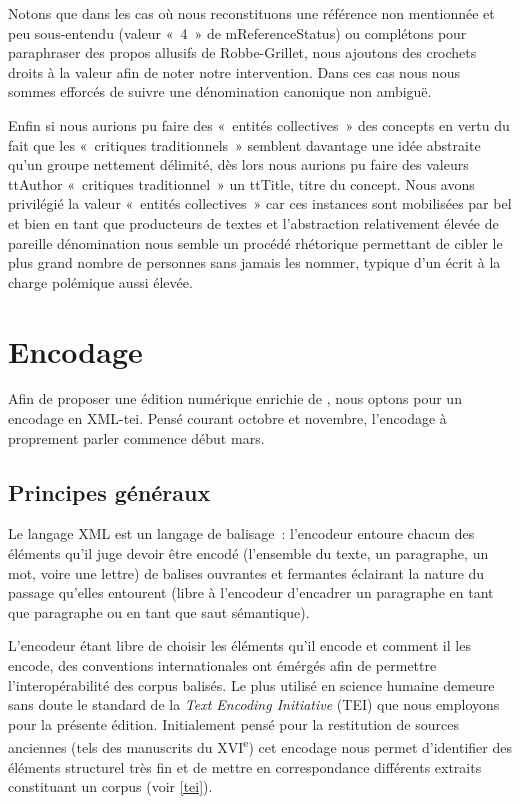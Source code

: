\documentclass[12pt, a4paper]{article}
\begin{document}
Notons que dans les cas où nous reconstituons une référence non mentionnée et peu sous-entendu (valeur «~4~» de mReferenceStatus) ou complétons pour paraphraser des propos allusifs de Robbe-Grillet, nous ajoutons des crochets droits à la valeur afin de noter notre intervention. Dans ces cas nous nous sommes efforcés de suivre une dénomination canonique non ambiguë.

Enfin si nous aurions pu faire des «~entités collectives~» des concepts en vertu du fait que les «~critiques traditionnels~» semblent davantage une idée abstraite qu'un groupe nettement délimité, dès lors nous aurions pu faire des valeurs ttAuthor «~critiques traditionnel~» un ttTitle, titre du concept. Nous avons privilégié la valeur «~entités collectives~» car ces instances sont mobilisées par \robbe{} bel et bien en tant que producteurs de textes et l'abstraction relativement élevée de pareille dénomination nous semble un procédé rhétorique permettant de cibler le plus grand nombre de personnes sans jamais les nommer, typique d'un écrit à la charge polémique aussi élevée.






\section{Encodage}
Afin de proposer une édition numérique enrichie de \punr, nous optons pour un encodage en XML-tei. Pensé courant octobre et novembre, l'encodage à proprement parler commence début mars.
    \subsection{Principes généraux}
Le langage XML est un langage de balisage~: l'encodeur entoure chacun des éléments qu'il juge devoir être encodé (l'ensemble du texte, un paragraphe, un mot, voire une lettre) de balises ouvrantes et fermantes éclairant la nature du passage qu'elles entourent (libre à l'encodeur d'encadrer un paragraphe en tant que paragraphe ou en tant que saut sémantique).


L'encodeur étant libre de choisir les éléments qu'il encode et comment il les encode, des conventions internationales ont émérgés afin de permettre l'interopérabilité des corpus balisés. Le plus utilisé en science humaine demeure sans doute le standard de la \textit{Text Encoding Initiative} (TEI) que nous employons pour la présente édition. Initialement pensé pour la restitution de sources anciennes (tels des manuscrits du \textsc{XVI}\textsuperscript{e}) cet encodage nous permet d'identifier des éléments structurel très fin et de mettre en correspondance différents extraits constituant un corpus (voir \ref{tei}).
\end{document}
